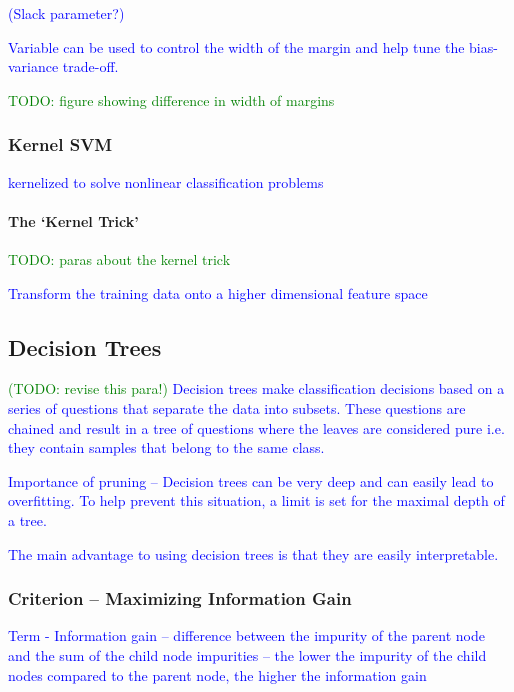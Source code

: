 \textcolor{blue}{(Slack parameter?)}

\textcolor{blue}{Variable can be used to control the width of the margin and help tune the bias-variance trade-off.}

\textcolor{green}{TODO: figure showing difference in width of margins}

\subsubsection{Kernel SVM}

\textcolor{blue}{kernelized to solve nonlinear classification problems}

\paragraph{The `Kernel Trick'}

\textcolor{green}{TODO: paras about the kernel trick}

\textcolor{blue}{Transform the training data onto a higher dimensional feature space}

\subsection{Decision Trees}

\textcolor{blue}{\textcolor{green}{(TODO: revise this para!)} Decision trees make classification decisions based on a series of questions that separate the data into subsets. These questions are chained and result in a tree of questions where the leaves are considered pure i.e. they contain samples that belong to the same class.}

\textcolor{blue}{Importance of pruning -- Decision trees can be very deep and can easily lead to overfitting. To help prevent this situation, a limit is set for the maximal depth of a tree. }

\textcolor{blue}{The main advantage to using decision trees is that they are easily interpretable.}

\subsubsection{Criterion -- Maximizing Information Gain}

\textcolor{blue}{Term - Information gain -- difference between the impurity of the parent node and the sum of the child node impurities -- the lower the impurity of the child nodes compared to the parent node, the higher the information gain}

